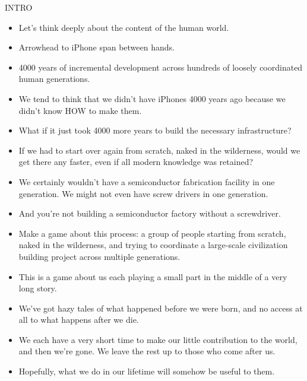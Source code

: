 \documentclass[12pt]{article}
\begin{document}
{\Huge

INTRO

\begin{itemize}

\item Let's think deeply about the content of the human world.

\item Arrowhead to iPhone span between hands.

\item 4000 years of incremental development across hundreds of loosely coordinated human generations.

\item We tend to think that we didn't have iPhones 4000 years ago because we didn't know HOW to make them.

\item What if it just took 4000 more years to build the necessary infrastructure?

\item If we had to start over again from scratch, naked in the wilderness, would we get there any faster, even if all modern knowledge was retained?

\item We certainly wouldn't have a semiconductor fabrication facility in one generation.  We might not even have screw drivers in one generation.

\item And you're not building a semiconductor factory without a screwdriver.

\item Make a game about this process:  a group of people starting from scratch, naked in the wilderness, and trying to coordinate a large-scale civilization building project across multiple generations.

\item This is a game about us each playing a small part in the middle of a very long story.

\item We've got hazy tales of what happened before we were born, and no access at all to what happens after we die.

\item We each have a very short time to make our little contribution to the world, and then we're gone.  We leave the rest up to those who come after us.

\item Hopefully, what we do in our lifetime will somehow be useful to them.


\end{itemize}}
\end{document}
